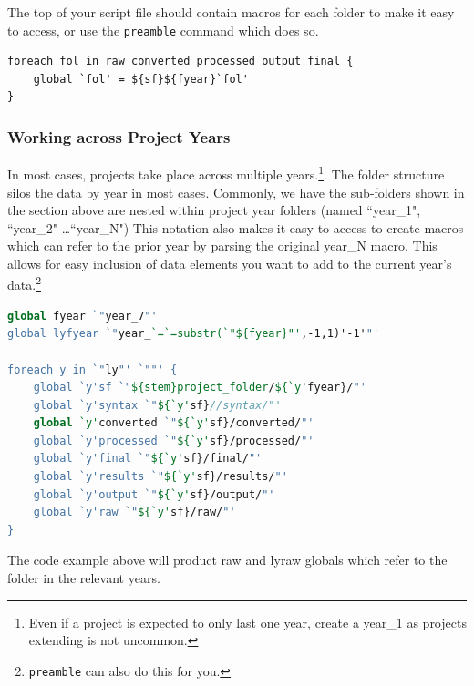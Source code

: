 The top of your script file should contain macros for each folder to make it easy to access, or use the \texttt{preamble} command which does so.
\begin{lstlisting}
foreach fol in raw converted processed output final {
	global `fol' = ${sf}${fyear}`fol'
}
\end{lstlisting}

\subsubsection{Working across Project Years} In most cases, projects take place across multiple years.\footnote{Even if a project is expected to only last one year, create a year\_1 as projects extending is not uncommon.}. The folder structure silos the data by year in most cases. Commonly, we have the sub-folders shown in the section above are nested within project year folders (named ``year\_1", ``year\_2" \ldots ``year\_N")  This notation also makes it easy to access to create macros which can refer to the prior year by parsing the original year\_N macro. This allows for easy inclusion of data elements you want to add to the current year\rq{}s data.\footnote{\texttt{preamble} can also do this for you.}

\begin{lstlisting}[language=Stata, numbers=none]
global fyear `"year_7"'
global lyfyear `"year_`=`=substr(`"${fyear}"',-1,1)'-1'"'

foreach y in `"ly"' `""' {
	global `y'sf `"${stem}project_folder/${`y'fyear}/"'
	global `y'syntax `"${`y'sf}//syntax/"'
	global `y'converted `"${`y'sf}/converted/"'
	global `y'processed `"${`y'sf}/processed/"'
	global `y'final `"${`y'sf}/final/"'
	global `y'results `"${`y'sf}/results/"'
	global `y'output `"${`y'sf}/output/"'
	global `y'raw `"${`y'sf}/raw/"'
}
\end{lstlisting}

The code example above will product raw and lyraw globals which refer to the folder in the relevant years.


